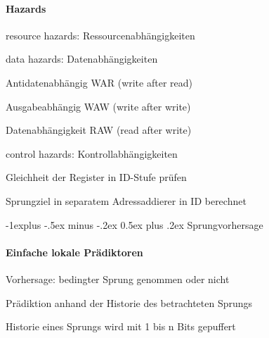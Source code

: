 \documentclass[10pt,landscape]{article}
\makeatletter
\renewcommand{\subsection}{\@startsection{subsection}{2}{0mm}%
                                {-1explus -.5ex minus -.2ex}%
                                {0.5ex plus .2ex}%
                                {\normalfont\normalsize\bfseries}}
\makeatother
\begin{document}
\begin{multicols}{3}
  \paragraph*{Hazards}
  \begin{itemize*}
    \item resource hazards: Ressourcenabhängigkeiten
    \item data hazards: Datenabhängigkeiten
    \begin{description*}
      \item[Antidatenabhängig] WAR (write after read)
      \item[Ausgabeabhängig] WAW (write after write)
      \item[Datenabhängigkeit] RAW (read after write)
    \end{description*}
    \item control hazards: Kontrollabhängigkeiten
    \begin{itemize*}
      \item Gleichheit der Register in ID-Stufe prüfen
      \item Sprungziel in separatem Adressaddierer in ID berechnet
    \end{itemize*}
  \end{itemize*}
  
  \subsection{Sprungvorhersage}
  \paragraph{Einfache lokale Prädiktoren}
  \begin{itemize*}
    \item Vorhersage: bedingter Sprung genommen oder nicht
    \item Prädiktion anhand der Historie des betrachteten Sprungs
    \item Historie eines Sprungs wird mit 1 bis n Bits gepuffert
  \end{itemize*}
  

\end{multicols}
\end{document}
